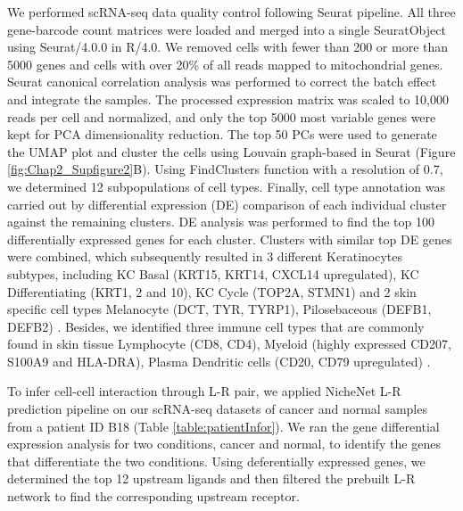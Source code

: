 We performed scRNA-seq data quality control following Seurat pipeline. All three gene-barcode count matrices were loaded and merged into a single SeuratObject using Seurat/4.0.0 in R/4.0. We removed cells with fewer than 200 or more than 5000 genes and cells with over 20\% of all reads mapped to mitochondrial genes. Seurat canonical correlation analysis was performed to correct the batch effect and integrate the samples. The processed expression matrix was scaled to 10,000 reads per cell and normalized, and only the top 5000 most variable genes were kept for PCA dimensionality reduction. The top 50 PCs were used to generate the UMAP plot and cluster the cells using Louvain graph-based in Seurat (Figure \ref{fig:Chap2_Supfigure2}B). Using FindClusters function with a resolution of 0.7, we determined 12 subpopulations of cell types. Finally, cell type annotation was carried out by differential expression (DE) comparison of each individual cluster against the remaining clusters. DE analysis was performed to find the top 100 differentially expressed genes for each cluster. Clusters with similar top DE genes were combined, which subsequently resulted in 3 different Keratinocytes subtypes, including KC Basal (KRT15, KRT14, CXCL14  upregulated), KC Differentiating (KRT1, 2 and 10), KC Cycle (TOP2A, STMN1)  \cite{joost2016single, ji2020multimodal} and 2 skin specific cell types Melanocyte (DCT, TYR, TYRP1), Pilosebaceous (DEFB1, DEFB2) \cite{belote2021human}. Besides, we identified three immune cell types that are commonly found in skin tissue  Lymphocyte (CD8, CD4), Myeloid (highly expressed CD207, S100A9 and HLA-DRA), Plasma Dendritic cells (CD20, CD79 upregulated) \cite{ji2020multimodal}.          

To infer cell-cell interaction through L-R pair, we applied NicheNet L-R prediction pipeline \cite{browaeys2020nichenet} on our scRNA-seq datasets of cancer and normal samples from a patient ID B18 (Table \ref{table:patientInfor}). We ran the gene differential expression analysis for two conditions, cancer and normal, to identify the genes that differentiate the two conditions. Using deferentially expressed genes, we determined the top 12 upstream ligands and then filtered the prebuilt L-R network to find the corresponding upstream receptor.

